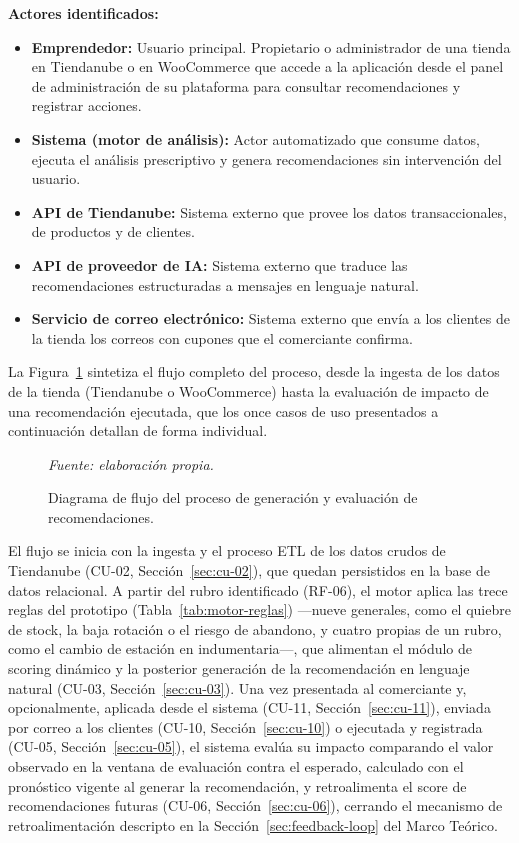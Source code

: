 \noindent\textbf{Actores identificados:}
\begin{itemize}
    \item \textbf{Emprendedor:} Usuario principal. Propietario o administrador de una tienda en Tiendanube o en WooCommerce que accede a la aplicación desde el panel de administración de su plataforma para consultar recomendaciones y registrar acciones.
    \item \textbf{Sistema (motor de análisis):} Actor automatizado que consume datos, ejecuta el análisis prescriptivo y genera recomendaciones sin intervención del usuario.
    \item \textbf{API de Tiendanube:} Sistema externo que provee los datos transaccionales, de productos y de clientes.
    \item \textbf{API de proveedor de IA:} Sistema externo que traduce las recomendaciones estructuradas a mensajes en lenguaje natural.
    \item \textbf{Servicio de correo electrónico:} Sistema externo que envía a los clientes de la tienda los correos con cupones que el comerciante confirma.
\end{itemize}

La Figura~\ref{fig:flujo-diagram} sintetiza el flujo completo del proceso, desde la ingesta de los datos de la tienda (Tiendanube o WooCommerce) hasta la evaluación de impacto de una recomendación ejecutada, que los once casos de uso presentados a continuación detallan de forma individual.

\begin{figure}[ht]
    \centering
    
    \caption{Diagrama de flujo del proceso de generación y evaluación de recomendaciones.}
    \label{fig:flujo-diagram}
\smallskip
\noindent\textit{Fuente: elaboración propia.}
\end{figure}

El flujo se inicia con la ingesta y el proceso ETL de los datos crudos de Tiendanube (CU-02, Sección~\ref{sec:cu-02}), que quedan persistidos en la base de datos relacional.
A partir del rubro identificado (RF-06), el motor aplica las trece reglas del prototipo (Tabla~\ref{tab:motor-reglas}) —nueve generales, como el quiebre de stock, la baja rotación o el riesgo de abandono, y cuatro propias de un rubro, como el cambio de estación en indumentaria—, que alimentan el módulo de scoring dinámico y la posterior generación de la recomendación en lenguaje natural (CU-03, Sección~\ref{sec:cu-03}). Una vez presentada al comerciante y, opcionalmente, aplicada desde el sistema (CU-11, Sección~\ref{sec:cu-11}), enviada por correo a los clientes (CU-10, Sección~\ref{sec:cu-10}) o ejecutada y registrada (CU-05, Sección~\ref{sec:cu-05}), el sistema evalúa su impacto comparando el valor observado en la ventana de evaluación contra el esperado, calculado con el pronóstico vigente al generar la recomendación, y retroalimenta el score de recomendaciones futuras (CU-06, Sección~\ref{sec:cu-06}), cerrando el mecanismo de retroalimentación descripto en la Sección~\ref{sec:feedback-loop} del Marco Teórico.

